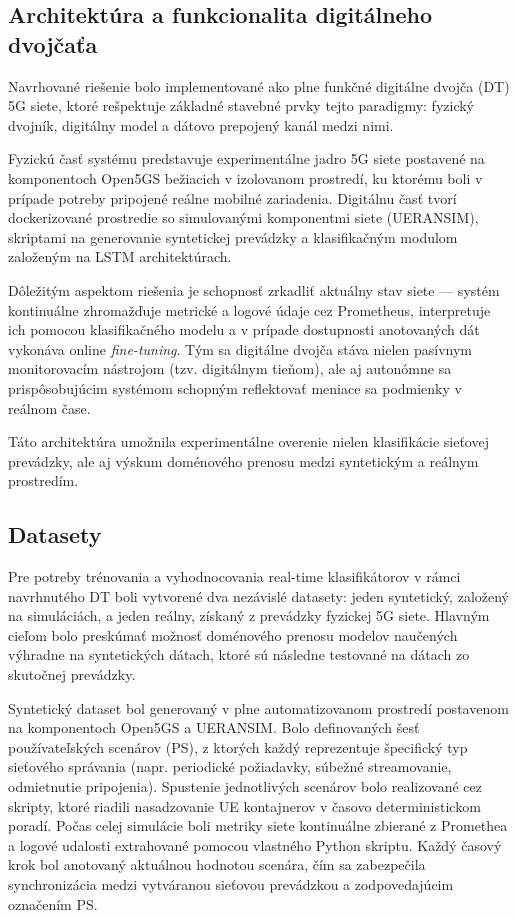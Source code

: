 \documentclass[a4paper,conference]{IEEEtran}
\begin{document}
\subsection{Architektúra a funkcionalita digitálneho dvojčaťa}
\label{subsec_dt}

Navrhované riešenie bolo implementované ako plne funkčné digitálne dvojča (DT) 5G siete, ktoré rešpektuje základné stavebné prvky tejto paradigmy: fyzický dvojník, digitálny model a dátovo prepojený kanál medzi nimi.

Fyzickú časť systému predstavuje experimentálne jadro 5G siete postavené na komponentoch Open5GS bežiacich v izolovanom prostredí, ku ktorému boli v prípade potreby pripojené reálne mobilné zariadenia. Digitálnu časť tvorí dockerizované prostredie so simulovanými komponentmi siete (UERANSIM), skriptami na generovanie syntetickej prevádzky a klasifikačným modulom založeným na LSTM architektúrach.

Dôležitým aspektom riešenia je schopnosť zrkadliť aktuálny stav siete — systém kontinuálne zhromažďuje metrické a logové údaje cez Prometheus, interpretuje ich pomocou klasifikačného modelu a v prípade dostupnosti anotovaných dát vykonáva online \textit{fine-tuning}. Tým sa digitálne dvojča stáva nielen pasívnym monitorovacím nástrojom (tzv. digitálnym tieňom), ale aj autonómne sa prispôsobujúcim systémom schopným reflektovať meniace sa podmienky v reálnom čase.

Táto architektúra umožnila experimentálne overenie nielen klasifikácie sieťovej prevádzky, ale aj výskum doménového prenosu medzi syntetickým a reálnym prostredím.



\subsection{Datasety}
\label{subsec1}
Pre potreby trénovania a vyhodnocovania real-time klasifikátorov v rámci navrhnutého DT boli vytvorené dva nezávislé datasety: jeden syntetický, založený na simuláciách, a jeden reálny, získaný z prevádzky fyzickej 5G siete. Hlavným cieľom bolo preskúmať možnosť doménového prenosu modelov naučených výhradne na syntetických dátach, ktoré sú následne testované na dátach zo skutočnej prevádzky.

Syntetický dataset bol generovaný v plne automatizovanom prostredí postavenom na komponentoch Open5GS a UERANSIM. Bolo definovaných šesť používateľských scenárov (PS), z ktorých každý reprezentuje špecifický typ sieťového správania (napr. periodické požiadavky, súbežné streamovanie, odmietnutie pripojenia). Spustenie jednotlivých scenárov bolo realizované cez skripty, ktoré riadili nasadzovanie UE kontajnerov v časovo deterministickom poradí. Počas celej simulácie boli metriky siete kontinuálne zbierané z Promethea a logové udalosti extrahované pomocou vlastného Python skriptu. Každý časový krok bol anotovaný aktuálnou hodnotou scenára, čím sa zabezpečila synchronizácia medzi vytváranou sieťovou prevádzkou a zodpovedajúcim označením PS.
\end{document}
